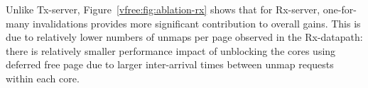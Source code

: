 Unlike Tx-server, Figure~\ref{vfree:fig:ablation-rx} shows that for Rx-server, one-for-many invalidations provides more significant contribution to overall gains. This is due to relatively lower numbers of unmaps per page observed in the Rx-datapath: there is relatively smaller performance impact of unblocking the cores using deferred free page due to larger inter-arrival times between unmap requests within each core. 





